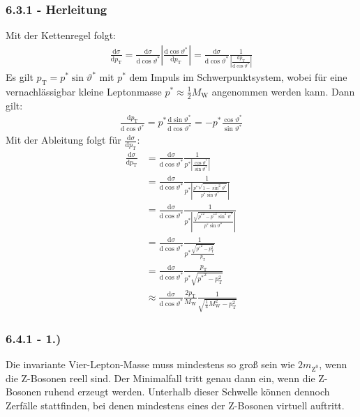 \documentclass[11pt, a4paper]{article}
\numberwithin{equation}{section}
\begin{document}
\begin{appendix}
\subsubsection*{6.3.1 - Herleitung}
\label{sssec:herleitung_jacobi}
Mit der Kettenregel folgt:
\begin{align*}
	\frac{\mathrm{d}\sigma}{\mathrm{d}p_\mathrm{T}} = \frac{\mathrm{d}\sigma}{\mathrm{d}\cos\vartheta^*}\left|\frac{\mathrm{d}\cos\vartheta^*}{\mathrm{d}p_\mathrm{T}}\right| = \frac{\mathrm{d}\sigma}{\mathrm{d}\cos\vartheta^*}\frac{1}{\left|\frac{\mathrm{d}p_\mathrm{T}}{\mathrm{d}\cos\vartheta^*}\right|}
\end{align*}
Es gilt $p_\mathrm{T}=p^*\sin\vartheta^*$ mit $p^*$ dem Impuls im Schwerpunktsystem, wobei für eine vernachlässigbar kleine Leptonmasse $p^*\approx\frac{1}{2}M_\mathrm{W}$ angenommen werden kann.
Dann gilt:
\begin{align*}
	\frac{\mathrm{d}p_\mathrm{T}}{\mathrm{d}\cos\vartheta^*}=p^*\frac{\mathrm{d}\sin\vartheta^*}{\mathrm{d}\cos\vartheta^*}=-p^*\frac{\cos\vartheta^*}{\sin\vartheta^*}
\end{align*}
Mit der Ableitung folgt für $\frac{\mathrm{d}\sigma}{\mathrm{d}p_\mathrm{T}}$:
\begin{align*}
	\frac{\mathrm{d}\sigma}{\mathrm{d}p_\mathrm{T}}&=\frac{\mathrm{d}\sigma}{\mathrm{d}\cos\vartheta^*} \frac{1}{p^*\left|\frac{\cos\vartheta^*}{\sin\vartheta^*}\right|}\\
	&=\frac{\mathrm{d}\sigma}{\mathrm{d}\cos\vartheta^*} \frac{1}{p^*\left|\frac{p^*\sqrt{1-\sin^2\vartheta^*}}{p^*\sin\vartheta^*}\right|}\\
	&=\frac{\mathrm{d}\sigma}{\mathrm{d}\cos\vartheta^*} \frac{1}{p^*\left|\frac{\sqrt{{p^*}^2-{p^*}^2\sin^2\vartheta^*}}{p^*\sin\vartheta^*}\right|}\\
	&=\frac{\mathrm{d}\sigma}{\mathrm{d}\cos\vartheta^*} \frac{1}{p^*\frac{\sqrt{{p^*}^2-p_\mathrm{T}^2}}{p_\mathrm{T}}}\\
	&=\frac{\mathrm{d}\sigma}{\mathrm{d}\cos\vartheta^*} \frac{p_\mathrm{T}}{p^*\sqrt{{p^*}^2-p_\mathrm{T}^2}}\\
	&\approx \frac{\mathrm{d}\sigma}{\mathrm{d}\cos\vartheta^*} \frac{2p_\mathrm{T}}{M_\mathrm{W}} \frac{1}{\sqrt{\frac{1}{4}M_\mathrm{W}^2-p_\mathrm{T}^2}}
\end{align*}
\subsubsection*{6.4.1 - 1.)}
Die invariante Vier-Lepton-Masse muss mindestens so groß sein wie $2m_\mathrm{Z^0}$, wenn die Z-Bosonen reell sind.
Der Minimalfall tritt genau dann ein, wenn die Z-Bosonen ruhend erzeugt werden.
Unterhalb dieser Schwelle können dennoch Zerfälle stattfinden, bei denen mindestens eines der Z-Bosonen virtuell auftritt.


\end{appendix}
\end{document}
